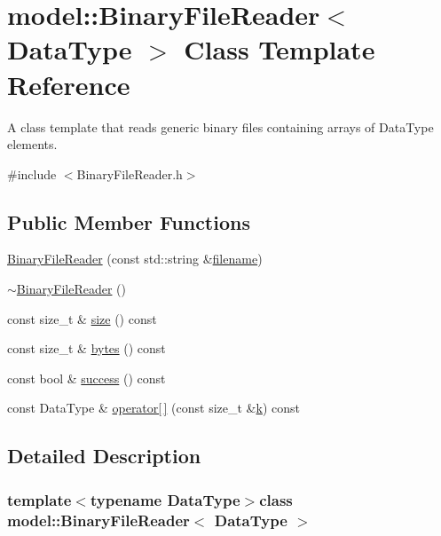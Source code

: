 \hypertarget{classmodel_1_1_binary_file_reader}{}\section{model\+:\+:Binary\+File\+Reader$<$ Data\+Type $>$ Class Template Reference}
\label{classmodel_1_1_binary_file_reader}


A class template that reads generic binary files containing arrays of Data\+Type elements.  




{\ttfamily \#include $<$Binary\+File\+Reader.\+h$>$}

\subsection*{Public Member Functions}
\begin{DoxyCompactItemize}
\item 
\hyperlink{classmodel_1_1_binary_file_reader_a5653ee60cf25539326d89babc48475f8}{Binary\+File\+Reader} (const std\+::string \&\hyperlink{_f_e_m_2linear__elasticity__3d_2tetgen_2generate_p_o_l_ycube_8m_a221163590ee33005cb379c7bec93f1ec}{filename})
\item 
\hyperlink{classmodel_1_1_binary_file_reader_a0603fa2832b5c469970ee480359e20f0}{$\sim$\+Binary\+File\+Reader} ()
\item 
const size\+\_\+t \& \hyperlink{classmodel_1_1_binary_file_reader_ac407d87c90447f683e66ae7d3951b42b}{size} () const 
\item 
const size\+\_\+t \& \hyperlink{classmodel_1_1_binary_file_reader_a5db2e45ba92ef469744957543382d7f3}{bytes} () const 
\item 
const bool \& \hyperlink{classmodel_1_1_binary_file_reader_a00ef0909cf0c5d8038753f150a47e028}{success} () const 
\item 
const Data\+Type \& \hyperlink{classmodel_1_1_binary_file_reader_acbbf6003d9906852c71da61a782fafeb}{operator\mbox{[}$\,$\mbox{]}} (const size\+\_\+t \&\hyperlink{_f_e_m_2linear__elasticity__3d_2tetgen_2generate_p_o_l_ycube_8m_a5d2aad4440da75aa43f2643e72b1a3bd}{k}) const 
\end{DoxyCompactItemize}


\subsection{Detailed Description}
\subsubsection*{template$<$typename Data\+Type$>$class model\+::\+Binary\+File\+Reader$<$ Data\+Type $>$}

